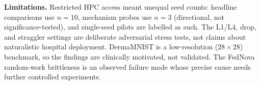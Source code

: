 \documentclass[11pt,a4paper]{article}
\begin{document}
\textbf{Limitations.} Restricted HPC access meant unequal seed counts: headline
comparisons use $n=10$, mechanism probes use $n=3$ (directional, not
significance-tested), and single-seed pilots are labelled as such. The L1/L4,
drop, and straggler settings are deliberate adversarial stress tests, not claims
about naturalistic hospital deployment. DermaMNIST is a low-resolution
($28\times28$) benchmark, so the findings are clinically motivated, not validated.
The FedNova random-work brittleness is an observed failure mode whose precise
cause needs further controlled experiments.
\end{document}
